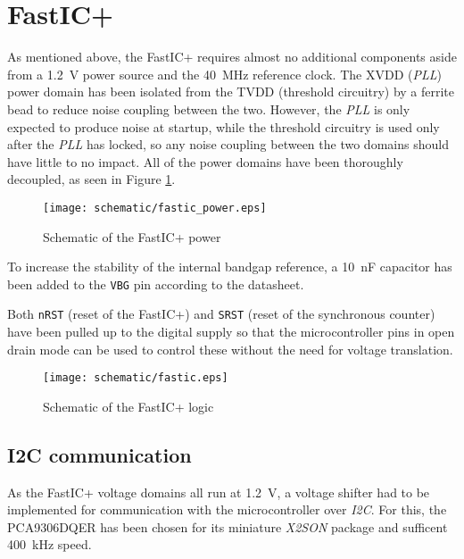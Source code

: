 \section{FastIC+}
As mentioned above, the FastIC+ requires almost no additional components aside from a \SI{1.2}{\volt} power source and the \SI{40}{\mega\hertz} reference clock. The XVDD (\emph{PLL}) power domain has been isolated from the TVDD (threshold circuitry) by a ferrite bead to reduce noise coupling between the two. However, the \emph{PLL} is only expected to produce noise at startup, while the threshold circuitry is used only after the \emph{PLL} has locked, so any noise coupling between the two domains should have little to no impact. \cite{ficDatasheet} All of the power domains have been thoroughly decoupled, as seen in Figure \ref{fig:fastic_power}.
%
\FloatBarrier
\begin{figure}[htp!]
    \centering
    \texttt{[image: schematic/fastic\_power.eps]}
    \caption{Schematic of the FastIC+ power}
    \label{fig:fastic_power}
\end{figure}
\FloatBarrier
%
To increase the stability of the internal bandgap reference, a \SI{10}{\nano\farad} capacitor has been added to the \verb|VBG| pin according to the datasheet. \cite{ficDatasheet} 

Both \verb|nRST| (reset of the FastIC+) and \verb|SRST| (reset of the synchronous counter) have been pulled up to the digital supply so that the microcontroller pins in open drain mode can be used to control these without the need for voltage translation. 

\FloatBarrier
\begin{figure}[htp!]
    \centering
    \texttt{[image: schematic/fastic.eps]}
    \caption{Schematic of the FastIC+ logic}
    \label{fig:fastic}
\end{figure}
\FloatBarrier


%
\subsection{I2C communication}
As the FastIC+ voltage domains all run at \SI{1.2}{\volt}, a voltage shifter had to be implemented for communication with the microcontroller over \emph{I2C}. For this, the PCA9306DQER has been chosen for its miniature \emph{X2SON} package and sufficent \SI{400}{\kilo\hertz} speed. \cite{pca9306dqer_datasheet}
%
